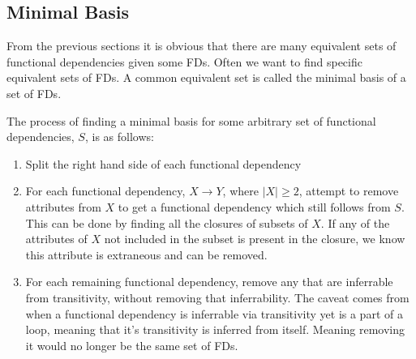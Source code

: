 \documentclass{report}
\begin{document}
        \subsection{Minimal Basis}

        From the previous sections it is obvious that there are many equivalent sets of functional dependencies given some FDs. Often we want to find specific equivalent sets of FDs. A common equivalent set is called the minimal basis of a set of FDs. 
\vspace{.5cm}
 
        \vspace{.5cm}


        The process of finding a minimal basis for some arbitrary set of functional dependencies, $S$, is as follows:

        \begin{enumerate}
            \item Split the right hand side of each functional dependency
            \item For each functional dependency, $X\rightarrow Y$, where $|X|\geq 2$, attempt to remove attributes from $X$ to get a functional dependency which still follows from $S$. This can be done by finding all the closures of subsets of $X$. If any of the attributes of $X$ not included in the subset is present in the closure, we know this attribute is extraneous and can be removed.
            \item For each remaining functional dependency, remove any that are inferrable from transitivity, without removing that inferrability. The caveat comes from when a functional dependency is inferrable via transitivity yet is a part of a loop, meaning that it's transitivity is inferred from itself. Meaning removing it would no longer be the same set of FDs. 
        \end{enumerate}
\end{document}
